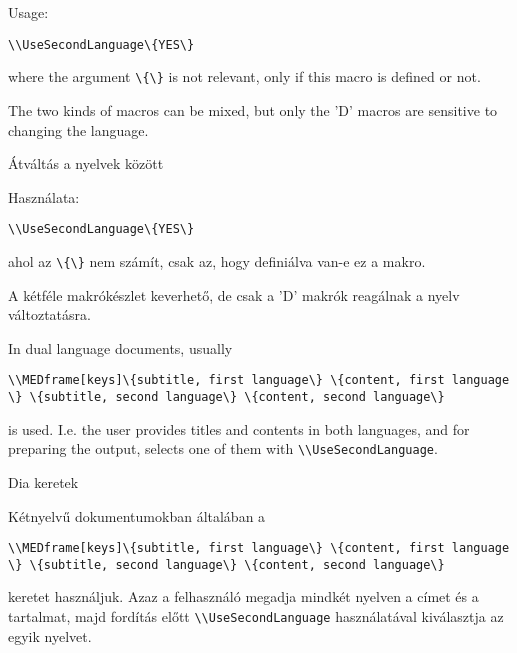 {

Usage:

\noindent\lstinline|\\UseSecondLanguage\{YES\}|

\noindent where the argument \lstinline|\{\}| is not relevant, only if this macro is defined or not.

The two kinds of macros can be mixed, but only the 'D' macros 
are sensitive to changing the language.
}
{Átváltás a nyelvek között}
{

Használata:

\noindent\lstinline|\\UseSecondLanguage\{YES\}|

\noindent ahol az \lstinline|\{\}| nem számít, csak az, hogy definiálva van-e ez a makro.

A kétféle makrókészlet keverhető, de csak a 'D' makrók reagálnak 
a nyelv változtatásra.
}


{
In dual language documents, usually 
\par\noindent\lstinline|\\MEDframe[keys]\{subtitle, first language\} \{content, first language \} \{subtitle, second language\} \{content, second language\}|
\par\noindent is used. I.e. the user provides titles and contents in both languages,
and for preparing the output, selects one of them with \lstinline|\\UseSecondLanguage|.
}
{Dia keretek}
{
Kétnyelvű dokumentumokban általában a
\par\noindent\lstinline|\\MEDframe[keys]\{subtitle, first language\} \{content, first language \} \{subtitle, second language\} \{content, second language\}|
\par\noindent  keretet használjuk. Azaz a felhasználó megadja mindkét nyelven
a címet és a tartalmat, majd fordítás előtt \lstinline|\\UseSecondLanguage|
használatával kiválasztja az egyik nyelvet.
}


